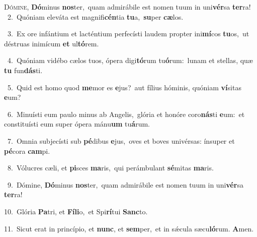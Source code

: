 \lettrine{\initial\textcolor{\initialcolor}{D}}{ómine,} \textbf{Dó}\-minus \textbf{nos}\-ter,~\star quam admirábile est nomen tuum in uni\-\textbf{vér}\-sa \textbf{ter}\-ra!\\
{\numbfont\textcolor{\numbcolor}{~2.}}~Quóniam eleváta est magnifi\-\textbf{cén}\-tia \textbf{tu}\-a,~\star \textbf{su}\-per \textbf{cæ}\-los.\par
{\numbfont\textcolor{\numbcolor}{~3.}}~Ex ore infántium et lacténtium perfecísti laudem propter ini\-\textbf{mí}\-cos \textbf{tu}\-os,~\star ut déstruas inimícum \textbf{et} ul\-\textbf{tó}\-rem.\par
{\numbfont\textcolor{\numbcolor}{~4.}}~Quóniam vidébo cælos tuos, ópera digi\-\textbf{tó}\-rum tu\-\textbf{ó}\-rum:~\star lunam et stellas, quæ \textbf{tu} fun\-\textbf{dás}\-ti.\par
{\numbfont\textcolor{\numbcolor}{~5.}}~Quid est homo quod \textbf{me}\-mor es \textbf{e}\-jus?~\star aut fílius hóminis, quóniam \textbf{ví}\-sitas \textbf{e}\-um?\par
{\numbfont\textcolor{\numbcolor}{~6.}}~Minuísti eum paulo minus ab Angelis,~\dagger glória et honóre coro\-\textbf{nás}\-ti \textbf{e}\-um:~\star et constituísti eum super ópera mánu\textbf{um} tu\-\textbf{á}\-rum.\par
{\numbfont\textcolor{\numbcolor}{~7.}}~Omnia subjecísti sub \textbf{pé}\-dibus \textbf{e}\-jus,~\star oves et boves univérsas: ínsuper et \textbf{pé}\-cora \textbf{cam}\-pi.\par
{\numbfont\textcolor{\numbcolor}{~8.}}~Vólucres cæli, et \textbf{pi}\-sces \textbf{ma}\-ris,~\star qui perámbulant \textbf{sé}\-mitas \textbf{ma}\-ris.\par
{\numbfont\textcolor{\numbcolor}{~9.}}~Dómine, \textbf{Dó}\-minus \textbf{nos}\-ter,~\star quam admirábile est nomen tuum in uni\-\textbf{vér}\-sa \textbf{ter}\-ra!\par
{\numbfont\textcolor{\numbcolor}{10.}}~Glória \textbf{Pa}\-tri, et \textbf{Fí}\-\textbf{li}o,~\star et Spi\-\textbf{rí}\-tui \textbf{Sanc}\-to.\par
{\numbfont\textcolor{\numbcolor}{11.}}~Sicut erat in princípio, et \textbf{nunc}\-, et \textbf{sem}\-per,~\star et in sǽcula sæcu\-\textbf{ló}\-rum. \textbf{A}\-men.\par
